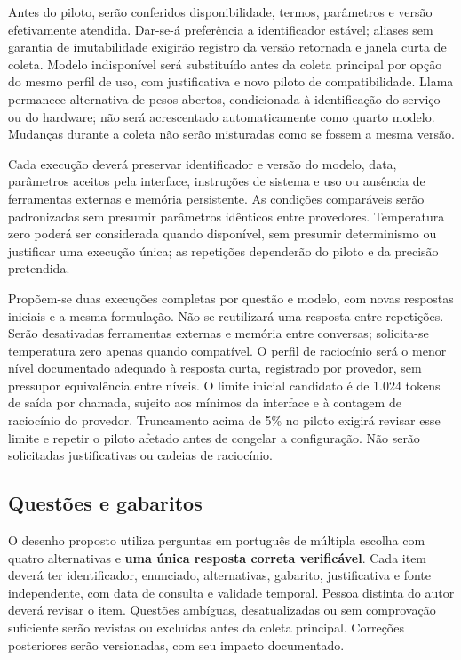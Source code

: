 Antes do piloto, serão conferidos disponibilidade, termos, parâmetros e versão efetivamente atendida. Dar-se-á preferência a identificador estável; aliases sem garantia de imutabilidade exigirão registro da versão retornada e janela curta de coleta. Modelo indisponível será substituído antes da coleta principal por opção do mesmo perfil de uso, com justificativa e novo piloto de compatibilidade. Llama permanece alternativa de pesos abertos, condicionada à identificação do serviço ou do hardware; não será acrescentado automaticamente como quarto modelo. Mudanças durante a coleta não serão misturadas como se fossem a mesma versão.

Cada execução deverá preservar identificador e versão do modelo, data, parâmetros aceitos pela interface, instruções de sistema e uso ou ausência de ferramentas externas e memória persistente. As condições comparáveis serão padronizadas sem presumir parâmetros idênticos entre provedores. Temperatura zero poderá ser considerada quando disponível, sem presumir determinismo ou justificar uma execução única; as repetições dependerão do piloto e da precisão pretendida.

Propõem-se duas execuções completas por questão e modelo, com novas respostas iniciais e a mesma formulação. Não se reutilizará uma resposta entre repetições. Serão desativadas ferramentas externas e memória entre conversas; solicita-se temperatura zero apenas quando compatível. O perfil de raciocínio será o menor nível documentado adequado à resposta curta, registrado por provedor, sem pressupor equivalência entre níveis. O limite inicial candidato é de 1.024 tokens de saída por chamada, sujeito aos mínimos da interface e à contagem de raciocínio do provedor. Truncamento acima de 5\% no piloto exigirá revisar esse limite e repetir o piloto afetado antes de congelar a configuração. Não serão solicitadas justificativas ou cadeias de raciocínio.

\subsection{Questões e gabaritos}

O desenho proposto utiliza perguntas em português de múltipla escolha com quatro alternativas e \textbf{uma única resposta correta verificável}. Cada item deverá ter identificador, enunciado, alternativas, gabarito, justificativa e fonte independente, com data de consulta e validade temporal. Pessoa distinta do autor deverá revisar o item. Questões ambíguas, desatualizadas ou sem comprovação suficiente serão revistas ou excluídas antes da coleta principal. Correções posteriores serão versionadas, com seu impacto documentado.

